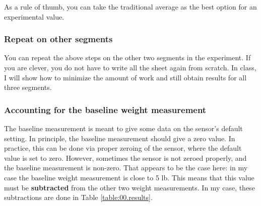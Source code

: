 As a rule of thumb, you can take the traditional average as the best option for an experimental value.
\subsubsection{Repeat on other segments}
You can repeat the above steps on the other two segments in the experiment. If you are clever, you do not have to write all the sheet again from scratch. In class, I will show how to minimize the amount of work and still obtain results for all three segments.
\subsubsection{Accounting for the baseline weight measurement}
The baseline measurement is meant to give some data on the sensor's default setting. In principle, the baseline measurement should give a zero value. In practice, this can be done via proper zeroing of the sensor, where the default value is set to zero. However, sometimes the sensor is not zeroed properly, and the baseline measurement is non-zero. That appears to be the case here: in my case the baseline weight measurement is close to 5 lb. This means that this value must be \textbf{subtracted} from the other two weight measurements. In my case, these subtractions are done in Table \ref{table:00.results}.
